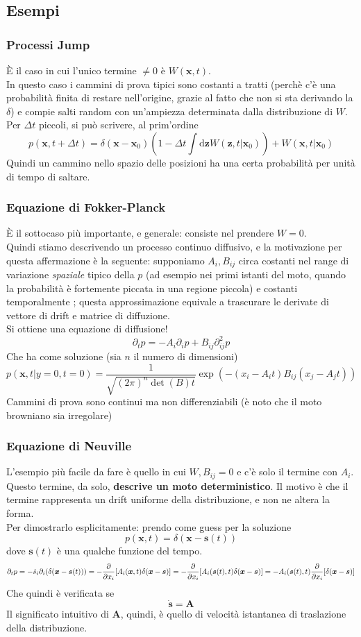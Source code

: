 \documentclass[a4paper,12pt]{article}
\theoremstyle{plain}
\renewcommand{\vec}[1]{{\boldsymbol{#1}}}
\theoremstyle{definition}
\newcommand{\f}[2]{\frac{#1}{#2}}
\renewcommand{\d}{\text{d}}
\newcommand{\pos}{\vec{x}}
\theoremstyle{remark}
\begin{document}
\subsection{Esempi}
\subsubsection{Processi Jump}
È il caso in cui l'unico termine $\ne 0$ è $W(\pos,t)$. \\In questo caso i cammini di prova tipici sono costanti a tratti (perchè c'è una probabilità finita di restare nell'origine, grazie al fatto che non si sta derivando la $\delta$) e compie salti random con un'ampiezza determinata dalla distribuzione di $W$.
\\ Per $\Delta t$ piccoli, si può scrivere, al prim'ordine
\[p(\pos,t+\Delta t)=\delta(\pos-\pos_0)\left(1-\Delta t \int \d \vec{z} W(\vec{z},t|\pos_0)		\right)+W(\pos,t|\pos_0)\]
Quindi un cammino nello spazio delle posizioni ha una certa probabilità per unità di tempo di saltare.
\subsubsection{Equazione di Fokker-Planck}
È il sottocaso più importante, e generale: consiste nel prendere $W=0$.\\Quindi stiamo descrivendo un processo continuo diffusivo, e la motivazione per questa affermazione è la seguente: supponiamo $A_i,B_{ij}$ circa costanti nel range di variazione \emph{spaziale} tipico della $p$ (ad esempio nei primi istanti del moto, quando la probabilità è fortemente piccata in una regione piccola) e costanti temporalmente ; questa approssimazione equivale a trascurare le derivate di vettore di drift e matrice di diffuzione.\\Si ottiene una equazione di diffusione!
\[\partial_tp=-A_i\partial_i p+B_{ij}	\partial^2_{ij}p	\]
Che ha come soluzione (sia $n$ il numero di dimensioni)
\[p(\pos,t|y=0,t=0)=\f{1}{\sqrt{(2\pi)^n \det(B)t}}\exp(-(x_i-A_it)B_{ij}(x_j-A_j t))\]
Cammini di prova sono continui ma non differenziabili (è noto che il moto browniano sia irregolare)
\subsubsection{Equazione di Neuville}
L'esempio più facile da fare è quello in cui $W,B_{ij}=0$ e c'è solo il termine con $A_i$.\\Questo termine, da solo, \textbf{descrive un moto deterministico}. Il motivo è che il termine rappresenta un drift uniforme della distribuzione, e non ne altera la forma.
\\Per dimostrarlo esplicitamente: prendo come guess per la soluzione\[p(\pos,t)=\delta(\pos-\vec{s}(t))\]
dove $\vec{s}(t)$ è una qualche funzione del tempo.
\[\partial_t p=-\dot{{s}}_i \partial_i(\delta(\pos-\vec{s}(t)))=-\pdv{}{x_i}[A_i(\pos,t)\delta(\pos-\vec{s})]=-\pdv{}{x_i}[A_i(\vec{s}(t),t)\delta(\pos-\vec{s})]=-A_i(\vec{s}(t),t)\pdv{}{x_i}[\delta(\pos-\vec{s})]\]
Che quindi è verificata se \[\dot{\vec{s}}=\vec{A}\]
Il significato intuitivo di $\vec{A}$, quindi, è quello di velocità istantanea di traslazione della distribuzione.
\end{document}
